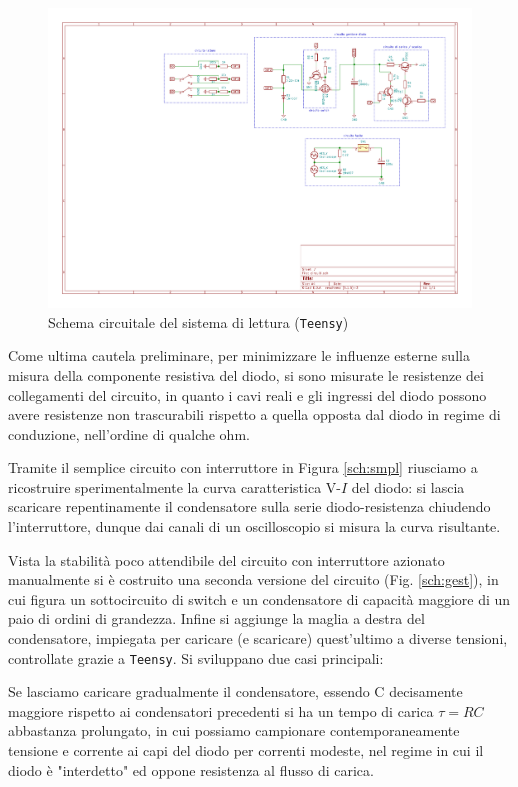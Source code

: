 \documentclass{article}[a4paper, oneside, 11pt]
\begin{document}
\begin{figure}[!htb]
	\centering 
 		\includegraphics[scale=2.2]{./measure.pdf}
 	\caption{Schema circuitale del sistema di lettura (\texttt{Teensy})\label{sch:rdng}}
\end{figure}
Come ultima cautela preliminare, per minimizzare le influenze esterne sulla misura della componente resistiva del diodo, si sono misurate le resistenze dei collegamenti del circuito, in quanto i cavi reali e gli ingressi del diodo possono avere resistenze non trascurabili rispetto a quella opposta dal diodo in regime di conduzione, nell'ordine di qualche ohm.

Tramite il semplice circuito con interruttore in Figura \ref{sch:smpl} riusciamo a ricostruire sperimentalmente la curva caratteristica V-$I$ del diodo: si lascia scaricare repentinamente il condensatore sulla serie diodo-resistenza chiudendo l'interruttore, dunque dai canali di un oscilloscopio si misura la curva risultante.

Vista la stabilità poco attendibile del circuito con interruttore azionato manualmente si è costruito una seconda versione del circuito (Fig. \ref{sch:gest}), in cui figura un sottocircuito di switch e un condensatore di capacità maggiore di un paio di ordini di grandezza. Infine si aggiunge la maglia a destra del condensatore, impiegata per caricare (e scaricare) quest'ultimo a diverse tensioni, controllate grazie a \verb+Teensy+.
Si sviluppano due casi principali:

Se lasciamo caricare gradualmente il condensatore, essendo C decisamente maggiore rispetto ai condensatori precedenti si ha un tempo di carica $\tau = RC$ abbastanza prolungato, in cui possiamo campionare contemporaneamente tensione e corrente ai capi del diodo per correnti modeste, nel regime in cui il diodo è "interdetto" ed oppone resistenza al flusso di carica.
\end{document}

